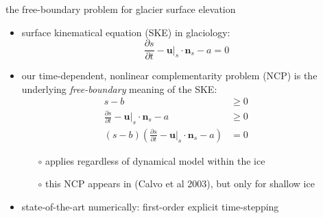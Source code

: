 \documentclass[10pt,svgnames]{beamer}
\newcommand{\bn}{\mathbf{n}}
\newcommand{\bu}{\mathbf{u}}
\begin{document}
\begin{frame}{the free-boundary problem for glacier surface elevation}

\begin{itemize}
\item surface kinematical equation (SKE) in glaciology:
   $$\frac{\partial s}{\partial t} - \bu|_s \cdot \bn_s - a = 0$$
\item our time-dependent, nonlinear complementarity problem (NCP) is the underlying \emph{free-boundary} meaning of the SKE:
\begin{align*}
s - b &\ge 0 &&\phantom{x} \\
\frac{\partial s}{\partial t} - \bu|_s \cdot \bn_s - a &\ge 0 \\
(s - b) \left(\frac{\partial s}{\partial t} - \bu|_s \cdot \bn_s - a\right) &= 0
\end{align*}

    \begin{itemize}
    \item[$\circ$] applies regardless of dynamical model within the ice
    \item[$\circ$] this NCP appears in (Calvo et al 2003), but only for shallow ice
    \end{itemize}
\item state-of-the-art numerically: first-order explicit time-stepping
\end{itemize}
\end{frame}
\end{document}
